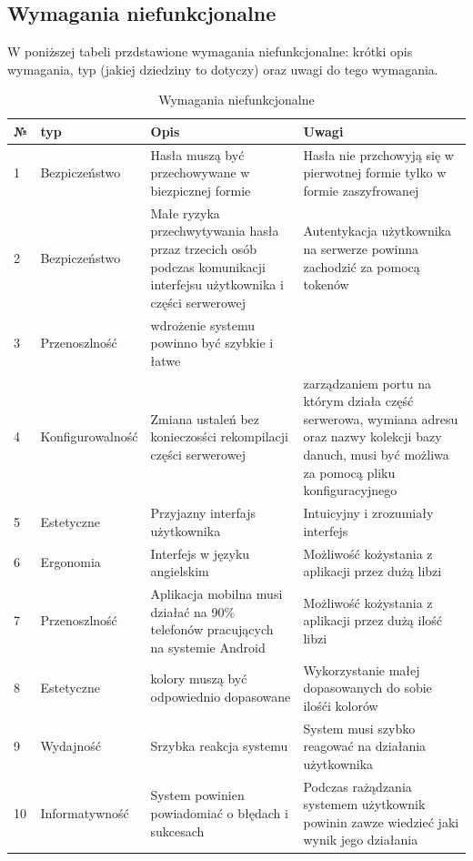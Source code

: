 \subsection{Wymagania niefunkcjonalne}
W poniższej tabeli przdstawione wymagania niefunkcjonalne: krótki opis wymagania, typ (jakiej dziedziny to dotyczy) oraz uwagi do tego wymagania.
\begin{table}[htb] \small
    \caption{Wymagania niefunkcjonalne}
    \begin{tabular}{| m{0.5cm} | m{3cm} | m{5.75cm} | m{5.75cm} |} 
    \hline
    № & typ & Opis & Uwagi \\
    \hline
    1 & Bezpiczeństwo & Hasła muszą być przechowywane w biezpicznej formie & Hasła nie przchowyją się w pierwotnej formie tylko w formie zaszyfrowanej \\ 
    \hline
    2 & Bezpiczeństwo & Małe ryzyka przechwytywania hasła przaz trzecich osób podczas komunikacji interfejsu użytkownika i części serwerowej & Autentykacja użytkownika na serwerze powinna zachodzić za pomocą tokenów \\ 
    \hline
    3 & Przenoszlność & wdrożenie systemu powinno być szybkie i łatwe & \\ 
    \hline
    4 & Konfigurowalność & Zmiana ustaleń bez konieczosści rekompilacji części serwerowej & zarządzaniem portu na którym działa część serwerowa, wymiana adresu oraz nazwy kolekcji bazy danuch, musi być możliwa za pomocą pliku konfiguracyjnego \\ 
    \hline
    5 & Estetyczne & Przyjazny interfajs użytkownika & Intuicyjny i zrozumiały interfejs \\ 
    \hline
    6 & Ergonomia & Interfejs w języku angielskim & Możliwość kożystania z aplikacji przez dużą libzi \\
    \hline
    7 & Przenoszlność & Aplikacja mobilna musi działać na 90\% telefonów pracujących na systemie Android & Możliwość kożystania z aplikacji przez dużą ilość libzi \\
    \hline
    8 & Estetyczne & kolory muszą być odpowiednio dopasowane & Wykorzystanie małej dopasowanych do sobie ilośći kolorów  \\
    \hline
    9 & Wydajność & Srzybka reakcja systemu & System musi szybko reagować na działania użytkownika \\
    \hline
    10 & Informatywność & System powinien powiadomiać o błędach i sukcesach  & Podczas rażądzania systemem użytkownik powinin zawze wiedzieć jaki wynik jego działania \\

\end{tabular}
\end{table}
